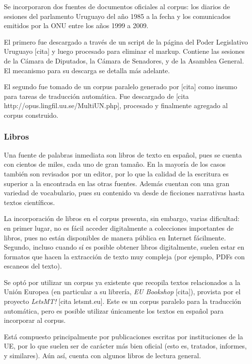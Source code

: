 Se incorporaron dos fuentes de documentos oficiales al corpus: los diarios de sesiones del
parlamento Uruguayo del año 1985 a la fecha y los comunicados emitidos por la ONU entre los años
1999 a 2009.

El primero fue descargado a través de un script de la página del Poder Legislativo Uruguayo [cita] y
luego procesado para eliminar el markup. Contiene las sesiones de la Cámara de Diputados, la Cámara
de Senadores, y de la Asamblea General. El mecanismo para su descarga se detalla más adelante.

El segundo fue tomado de un corpus paralelo generado por [cita] como insumo para tareas de
traducción automática. Fue descargado de [cita http://opus.lingfil.uu.se/MultiUN.php], procesado y
finalmente agregado al corpus construido.


\subsubsection{Libros}

Una fuente de palabras inmediata son libros de texto en español, pues se cuenta con cientos de
miles, cada uno de gran tamaño. En la mayoría de los casos también son revisados por un editor, por
lo que la calidad de la escritura es superior a la encontrada en las otras fuentes. Además cuentan
con una gran variedad de vocabulario, pues su contenido va desde de ficciones narrativas hasta
textos científicos.

La incorporación de libros en el corpus presenta, sin embargo, varias dificultad: en primer lugar,
no es fácil acceder digitalmente a colecciones importantes de libros, pues no están disponibles de
manera pública en Internet fácilmente. Segundo, incluso cuando sí es posible obtener libros
digitalmente, suelen estar en formatos que hacen la extracción de texto muy compleja (por ejemplo,
PDFs con escaneos del texto).

Se optó por utilizar un corpus ya existente que recopila textos relacionados a la Unión Europea (en
particular a su librería, \textit{EU Bookshop} [cita]), provista por el proyecto \textit{LetsMT!}
[cita letsmt.eu]. Este es un corpus paralelo para la traducción automática, pero es posible utilizar
únicamente los textos en español para incorporar al corpus.

Está compuesto principalmente por publicaciones escritas por instituciones de la UE, por lo que
suelen ser de carácter más bien oficial (esto es, tratados, informes, y similares). Aún así, cuenta
con algunos libros de lectura general.


